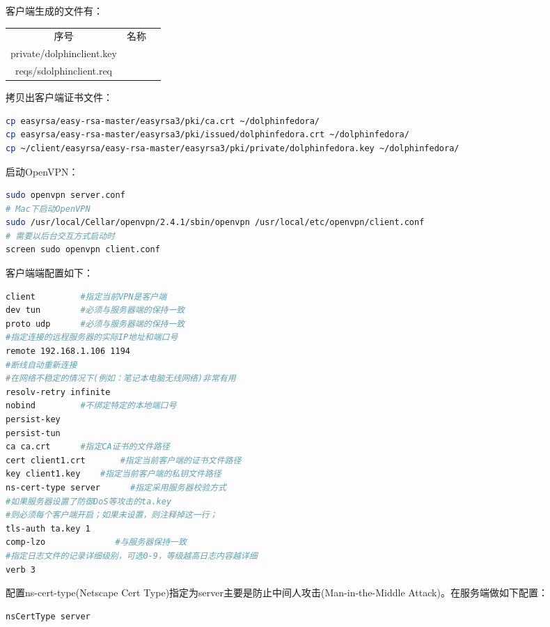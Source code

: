\documentclass[12pt]{book}
\numberwithin{dummy}{section}
\theoremstyle{ocrenumbox}
\theoremstyle{blacknumex}
\theoremstyle{blacknumbox}
\theoremstyle{ocrenum}
\begin{document}
客户端生成的文件有：

\begin{tabular}{|c|p{8cm}|c|}
	\hline
	\multirow{1}{*}{序号}
	& \multicolumn{1}{c|}{名称}  \\			
	\cline{1-2}
	private/dolphinclient.key  & \\
	\hline
	reqs/sdolphinclient.req & \\
	\hline
\end{tabular}

拷贝出客户端证书文件：

\begin{lstlisting}[language=Bash]
cp easyrsa/easy-rsa-master/easyrsa3/pki/ca.crt ~/dolphinfedora/
cp easyrsa/easy-rsa-master/easyrsa3/pki/issued/dolphinfedora.crt ~/dolphinfedora/
cp ~/client/easyrsa/easy-rsa-master/easyrsa3/pki/private/dolphinfedora.key ~/dolphinfedora/
\end{lstlisting}


启动OpenVPN：

\begin{lstlisting}[language=Bash]
sudo openvpn server.conf
# Mac下启动OpenVPN
sudo /usr/local/Cellar/openvpn/2.4.1/sbin/openvpn /usr/local/etc/openvpn/client.conf
# 需要以后台交互方式启动时
screen sudo openvpn client.conf
\end{lstlisting}

客户端端配置如下：

\begin{lstlisting}[language=Bash]
client         #指定当前VPN是客户端
dev tun        #必须与服务器端的保持一致
proto udp      #必须与服务器端的保持一致
#指定连接的远程服务器的实际IP地址和端口号
remote 192.168.1.106 1194      
#断线自动重新连接
#在网络不稳定的情况下(例如：笔记本电脑无线网络)非常有用
resolv-retry infinite
nobind         #不绑定特定的本地端口号
persist-key
persist-tun
ca ca.crt      #指定CA证书的文件路径
cert client1.crt       #指定当前客户端的证书文件路径
key client1.key    #指定当前客户端的私钥文件路径
ns-cert-type server      #指定采用服务器校验方式
#如果服务器设置了防御DoS等攻击的ta.key
#则必须每个客户端开启；如果未设置，则注释掉这一行；
tls-auth ta.key 1     
comp-lzo              #与服务器保持一致
#指定日志文件的记录详细级别，可选0-9，等级越高日志内容越详细
verb 3                
\end{lstlisting}

配置ns-cert-type(Netscape Cert Type)指定为server主要是防止中间人攻击(Man-in-the-Middle Attack)。在服务端做如下配置：

\begin{lstlisting}[language=Bash]
nsCertType server
\end{lstlisting}
\end{document}
